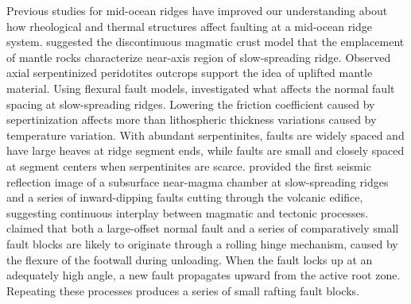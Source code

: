 \documentclass[letterpaper,12pt,notitle]{memphisthesis}                     %
\begin{document}
Previous studies for mid-ocean ridges have improved our understanding about how rheological and thermal structures affect faulting at a mid-ocean ridge system.
\citet{Cannat1993} suggested the discontinuous magmatic crust model that the emplacement of mantle rocks characterize near-axis region of slow-spreading ridge. Observed axial serpentinized peridotites outcrops support the idea of uplifted mantle material. Using flexural fault models, \citet{Escartin1997} investigated what affects the normal fault spacing at slow-spreading ridges. Lowering the friction coefficient caused by sepertinization affects more than lithospheric thickness variations caused by temperature variation. With abundant serpentinites, faults are widely spaced and have large heaves at ridge segment ends, while faults are small and closely spaced at segment centers when serpentinites are scarce. \citet{Singh2006} provided the first seismic reflection image of a subsurface near-magma chamber at slow-spreading ridges and a series of inward-dipping faults cutting through the volcanic edifice, suggesting continuous interplay between magmatic and tectonic processes. \citet{Reston2011} claimed that both a large-offset normal fault and a series of comparatively small fault blocks are likely to originate through a rolling hinge mechanism, caused by the flexure of the footwall during unloading. When the fault locks up at an adequately high angle, a new fault propagates upward from the active root zone. Repeating these processes produces a series of small rafting fault blocks.
\end{document}

